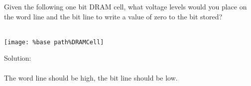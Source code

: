 Given the following one bit DRAM cell, what voltage levels would you place on the word line and the bit line to write a value of zero to the bit stored?\\ \\
\begin{center}
  \texttt{[image: \%base path\%DRAMCell]}
\end{center}

Solution: \\ \\
The word line should be high, the bit line should be low.
